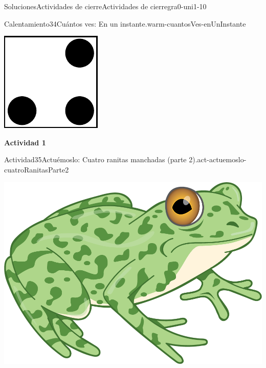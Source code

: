 \documentclass[twoside,10pt,]{article}
\begin{document}
\begin{solutions-section}{Soluciones}{Actividades de cierre}{}{Actividades de cierre}{}{}{gra0-uni1-10}
\begin{explorationsolution}{Calentamiento}{34}{Cuántos ves: En un instante.}{warm-cuantosVes-enUnInstante}
\begin{sidebyside}{2}{0}{0}{0}
\begin{sbspanel}{0.5}
\end{sbspanel}%
\begin{sbspanel}{0.5}%
\includegraphics[width=\linewidth]{external/svg-source/tikz-file-136326.pdf}
\end{sbspanel}%
\end{sidebyside}%
\end{explorationsolution}%
\par\medskip
\noindent\textbf{\large{}\space\textperiodcentered\space{}Actividad 1}
\begin{activitysolution}{Actividad}{35}{Actuémoslo: Cuatro ranitas manchadas (parte 2).}{act-actuemoslo-cuatroRanitasParte2}%
\begin{image}{0.275}{0.45}{0.275}{}%
\includegraphics[width=\linewidth]{external/png-source/RANA-VERDE.png}

\end{image}
\end{activitysolution}
\end{solutions-section}
\end{document}
